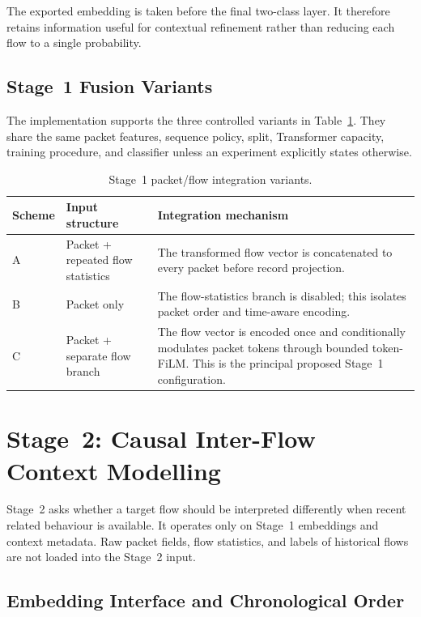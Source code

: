 \documentclass[11pt,fleqn]{report}
\begin{document}
The exported embedding is taken before the final two-class layer. It therefore retains information useful for contextual refinement rather than reducing each flow to a single probability.

\subsection{Stage~1 Fusion Variants}
\label{subsubsec:stage1_variants}

The implementation supports the three controlled variants in Table~\ref{tab:stage1_fusion_variants}. They share the same packet features, sequence policy, split, Transformer capacity, training procedure, and classifier unless an experiment explicitly states otherwise.

\begin{table}[H]
    \centering
    \caption{Stage~1 packet/flow integration variants.}
    \label{tab:stage1_fusion_variants}
    \small
    \begin{tabular}{@{}p{1.1cm}p{3.1cm}p{8.9cm}@{}}
        \toprule
        Scheme & Input structure & Integration mechanism \\
        \midrule
        A & Packet + repeated flow statistics & The transformed flow vector is concatenated to every packet before record projection. \\
        B & Packet only & The flow-statistics branch is disabled; this isolates packet order and time-aware encoding. \\
        C & Packet + separate flow branch & The flow vector is encoded once and conditionally modulates packet tokens through bounded token-FiLM. This is the principal proposed Stage~1 configuration. \\
        \bottomrule
    \end{tabular}
\end{table}

\section{Stage~2: Causal Inter-Flow Context Modelling}
\label{subsec:method_stage2}

Stage~2 asks whether a target flow should be interpreted differently when recent related behaviour is available. It operates only on Stage~1 embeddings and context metadata. Raw packet fields, flow statistics, and labels of historical flows are not loaded into the Stage~2 input.

\subsection{Embedding Interface and Chronological Order}
\label{subsubsec:embedding_interface}
\end{document}
